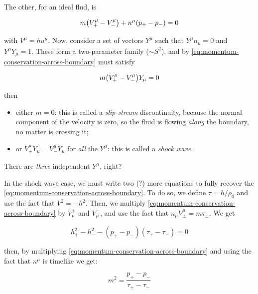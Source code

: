 \documentclass[main.tex]{subfiles}
\begin{document}
The other, for an ideal flud, is

\begin{equation} \label{eq:momentum-conservation-across-boundary}
    m \qty(V^\mu_+ - V^\mu _-) + n^\mu \qty(p_+ - p_-) = 0
\end{equation}

with \(V^\mu = h u^\mu\). Now, consider a set of vectors \(Y^\mu\) such that \(Y^\mu n_\mu = 0\) and \(Y^\mu Y_\mu = 1\). These form a two-parameter family (\(\sim S^2\)), and
by \eqref{eq:momentum-conservation-across-boundary} must satisfy

\begin{equation}
    m \qty(V^\mu_+ - V^\mu _-) Y_\mu = 0
\end{equation}

then
\begin{itemize}
    \item either \(m = 0\): this is called a \emph{slip-stream} discontinuity, because the normal component of the velocity is zero, so the fluid is flowing \emph{along} the boundary, no matter is crossing it;
    \item  or \(V^\mu _+ Y_\mu = V^\mu _- Y_\mu\) for \emph{all} the \(Y^\mu\): this is called a \emph{shock wave}.
\end{itemize}

\begin{greenbox}
  There are \emph{three} independent \(Y^\mu\), right?
\end{greenbox}

In the shock wave case, we must write two (?) more equations to fully recover the \eqref{eq:momentum-conservation-across-boundary}. To do so, we define \(\tau = h/\rho_0\) and use the fact that \(V^2 = -h^2\).
Then, we multiply \eqref{eq:momentum-conservation-across-boundary} by \(V_{\mu}^{+}\) and \(V_{\mu}^{-}\), and use the fact that \(n_\mu V^\mu_{\pm} = m \tau_{\pm}\). We get

\begin{equation} \label{eq:rankine-hugoniot-2}
    h^2_+ - h^2_- - (p_+ - p_-)(\tau_+ - \tau_-) = 0
\end{equation}

then, by multiplying \eqref{eq:momentum-conservation-across-boundary} and using the fact that \(n^\mu\) is timelike we get:

\begin{equation}\label{eq:rankine-hugoniot-3}
    m^2 = \frac{p_+ - p_-}{\tau_+ - \tau_-}
\end{equation}
\end{document}
